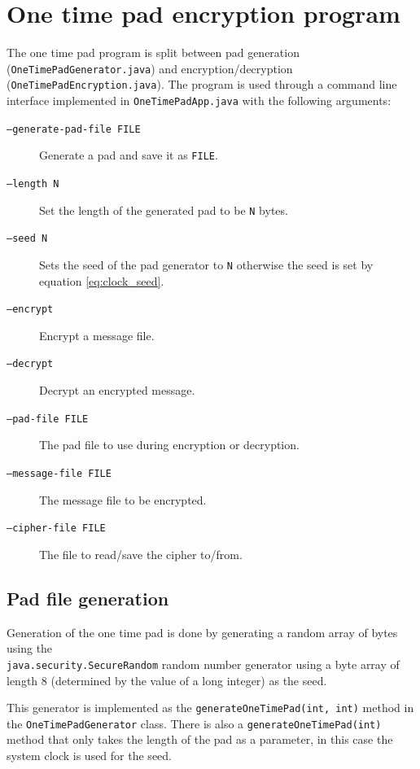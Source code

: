 \documentclass[a4paper]{article}
\title{\DOCTITLE}
\author{\DOCAUTHOR}
\date{\DOCDATE}
\begin{document}
\section{One time pad encryption program}

The one time pad program is split between pad generation
(\texttt{OneTimePadGenerator.java}) and encryption/decryption
(\texttt{OneTimePadEncryption.java}). The program is used through a command line
interface implemented in \texttt{OneTimePadApp.java} with the following
arguments:

\begin{description}
  \item[\texttt{--generate-pad-file FILE}]
    Generate a pad and save it as \texttt{FILE}.
  \item[\texttt{--length N}]
    Set the length of the generated pad to be \texttt{N} bytes.
  \item[\texttt{--seed N}]
    Sets the seed of the pad generator to \texttt{N} otherwise the seed is set
    by equation \ref{eq:clock_seed}.
  \item[\texttt{--encrypt}]
    Encrypt a message file.
  \item[\texttt{--decrypt}]
    Decrypt an encrypted message.
  \item[\texttt{--pad-file FILE}]
    The pad file to use during encryption or decryption.
  \item[\texttt{--message-file FILE}]
    The message file to be encrypted.
  \item[\texttt{--cipher-file FILE}]
    The file to read/save the cipher to/from.
\end{description}

\subsection{Pad file generation}

Generation of the one time pad is done by generating a random array of bytes
using the \\ \texttt{java.security.SecureRandom} random number generator using a
byte array of length 8 (determined by the value of a long integer) as the seed.

This generator is implemented as the \texttt{generateOneTimePad(int, int)}
method in the \texttt{OneTimePadGenerator} class. There is also a
\texttt{generateOneTimePad(int)} method that only takes the length of the pad as
a parameter, in this case the system clock is used for the seed.
\end{document}
